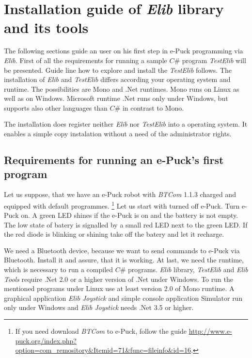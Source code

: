 \appendix
\chapter{Installation guide of {\it Elib} library and its tools} \label{app:installelib}
	The following sections guide an user on his first step in e-Puck programming via {\it Elib}.
	First of all the requirements for running a sample $C\#$ program {\it TestElib} will be presented.
	Guide line how to explore and install the {\it TestElib} follows.
	The installation of {\it Elib} and {\it TestElib} differs according your operating system and runtime.
	The possibilities are Mono\cite{mono} and .Net runtimes. Mono runs on Linux as well as on Windows. Microsoft runtime .Net
	runs only under Windows, but supports also other languages than $C\#$ in contrast to Mono.

	The installation does register neither {\it Elib} nor {\it TestElib} into a operating system. It enables
	a simple copy instalation without a need of the administrator rights.
	\section{Requirements for running an e-Puck's first program}
	\label{sec:require}
	Let us suppose, that we have an e-Puck robot with {\it BTCom} 1.1.3 charged and equipped with default programmes.
	\footnote{\small{If you need download {\it BTCom} to e-Puck, follow the guide 
	\url{http://www.e-puck.org/index.php?option=com_remository&Itemid=71&func=fileinfo&id=16}.}}
	Let us start with turned off e-Puck. Turn e-Puck on.
	A green LED shines if the e-Puck is on and the battery is not empty.
	The low state of batery is signalled by a small red LED next to the green LED. 
	If the red diode is blinking or shining take off the batery and let it recharge.


	We need a Bluetooth device, because we want to send commands to e-Puck via Bluetooth. Install it and assure,
	that it is working.
	At last, we need the runtime, which is necessary to run a compiled $C\#$ programs. 
	{\it Elib} library, {\it TestElib} and {\it Elib Tools} require .Net 2.0 or a higher version of .Net under Windows.
	To run the mentioned programs under Linux use at least version 2.0 of Mono runtime.
	A graphical application {\it Elib Joystick} and simple console application Simulator
	run only under Windows and {\it Elib Joystick} needs .Net 3.5 or higher.

